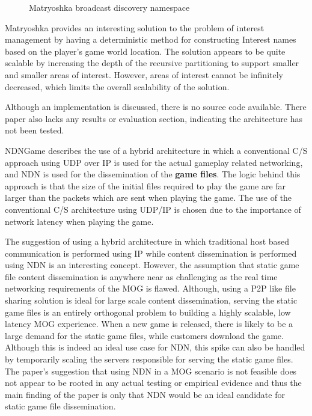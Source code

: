 \begin{figure}[H]
    \centering
    \caption{Matryoshka broadcast discovery namespace}
    \label{fig:matryoshka-discovery}
\end{figure}

Matryoshka provides an interesting solution to the problem of interest management by having a deterministic method for constructing Interest names based on the player's game world location. The solution appears to be quite scalable by increasing the depth of the recursive partitioning to support smaller and smaller areas of interest. However, areas of interest cannot be infinitely decreased, which limits the overall scalability of the solution. 

Although an implementation is discussed, there is no source code available. There paper also lacks any results or evaluation section, indicating the architecture has not been tested.   

NDNGame describes the use of a hybrid architecture in which a conventional C/S approach using UDP over IP is used for the actual gameplay related networking, and NDN is used for the dissemination of the \textbf{game files}. The logic behind this approach is that the size of the initial files required to play the game are far larger than the packets which are sent when playing the game. The use of the conventional C/S architecture using UDP/IP is chosen due to the importance of network latency when playing the game. 

The suggestion of using a hybrid architecture in which traditional host based communication is performed using IP while content dissemination is performed using NDN is an interesting concept. However, the assumption that static game file content dissemination is anywhere near as challenging as the real time networking requirements of the MOG is flawed. Although, using a P2P like file sharing solution is ideal for large scale content dissemination, serving the static game files is an entirely orthogonal problem to building a highly scalable, low latency MOG experience. When a new game is released, there is likely to be a large demand for the static game files, while customers download the game. Although this is indeed an ideal use case for NDN, this spike can also be handled by temporarily scaling the servers responsible for serving the static game files. The paper's suggestion that using NDN in a MOG scenario is not feasible does not appear to be rooted in any actual testing or empirical evidence and thus the main finding of the paper is only that NDN would be an ideal candidate for static game file dissemination.  

